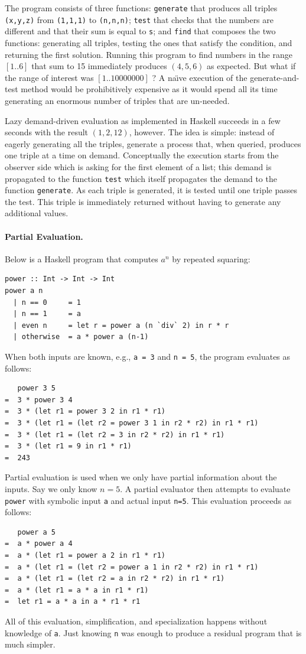 \documentclass{article}
\begin{document}
The program consists of three functions: \verb|generate| that produces
all triples \verb|(x,y,z)| from \verb|(1,1,1)| to \verb|(n,n,n)|;
\verb|test| that checks that the numbers are different and that their
sum is equal to \verb|s|; and \verb|find| that composes the two
functions: generating all triples, testing the ones that satisfy the
condition, and returning the first solution. Running this program to
find numbers in the range $[1..6]$ that sum to 15 immediately produces
$(4,5,6)$ as expected. But what if the range of interest was
$[1..10000000]$ ? A na\"\i ve execution of the generate-and-test
method would be prohibitively expensive as it would spend all its time
generating an enormous number of triples that are un-needed.

Lazy demand-driven evaluation as implemented in Haskell succeeds in a
few seconds with the result $(1,2,12)$, however. The idea is simple:
instead of eagerly generating all the triples, generate a process
that, when queried, produces one triple at a time on
demand. Conceptually the execution starts from the observer side which
is asking for the first element of a list; this demand is propagated
to the function \verb|test| which itself propagates the demand to the
function \verb|generate|. As each triple is generated, it is tested
until one triple passes the test. This triple is immediately returned
without having to generate any additional values.

\paragraph*{Partial Evaluation.}
Below is a Haskell program that computes $a^n$ by repeated squaring:
\begin{verbatim}
power :: Int -> Int -> Int
power a n
  | n == 0     = 1
  | n == 1     = a
  | even n     = let r = power a (n `div` 2) in r * r 
  | otherwise  = a * power a (n-1)
\end{verbatim}
When both inputs are known, e.g., \verb|a = 3| and \verb|n = 5|, the
program evaluates as follows:
\begin{verbatim}
   power 3 5
=  3 * power 3 4
=  3 * (let r1 = power 3 2 in r1 * r1)
=  3 * (let r1 = (let r2 = power 3 1 in r2 * r2) in r1 * r1)
=  3 * (let r1 = (let r2 = 3 in r2 * r2) in r1 * r1)
=  3 * (let r1 = 9 in r1 * r1)
=  243
\end{verbatim}

Partial evaluation is used when we only have partial information about
the inputs. Say we only know $n=5$. A partial evaluator then attempts
to evaluate \verb|power| with symbolic input \verb|a| and actual input
\verb|n=5|. This evaluation proceeds as follows:
\begin{verbatim}
   power a 5 
=  a * power a 4 
=  a * (let r1 = power a 2 in r1 * r1)
=  a * (let r1 = (let r2 = power a 1 in r2 * r2) in r1 * r1)
=  a * (let r1 = (let r2 = a in r2 * r2) in r1 * r1)
=  a * (let r1 = a * a in r1 * r1)
=  let r1 = a * a in a * r1 * r1
\end{verbatim}
All of this evaluation, simplification, and specialization happens
without knowledge of \verb|a|. Just knowing \verb|n| was enough to
produce a residual program that is much simpler. 
\end{document}
